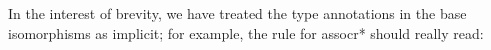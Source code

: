 \documentclass{llncs}
\newcommand{\roshan}[1]{\textsc{Roshan says:} 
  \textit{#1}
}
\begin{document}
In the interest of brevity, we have treated the type annotations in the base
isomorphisms as implicit; for example, the rule for {{assocr*}} should really
read:











\end{document}

